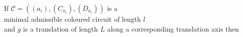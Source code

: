 \documentclass[preview]{standalone}
\begin{document}
\begin{center}
If $\mathcal{C} = ((a_i), (C_{a_i}), (D_{\overline{a_i}}))$ is a \\ minimal admissible coloured circuit of length $l$ \\ and $g$ is a translation of length $L$ along a corresponding translation axis then
\end{center}
\end{document}
